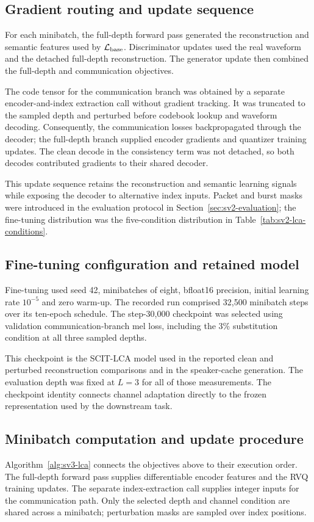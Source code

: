 \subsection{Gradient routing and update sequence}
For each minibatch, the full-depth forward pass generated the reconstruction and semantic features used by $\mathcal L_{\rm base}$. Discriminator updates used the real waveform and the detached full-depth reconstruction. The generator update then combined the full-depth and communication objectives.

The code tensor for the communication branch was obtained by a separate encoder-and-index extraction call without gradient tracking. It was truncated to the sampled depth and perturbed before codebook lookup and waveform decoding. Consequently, the communication losses backpropagated through the decoder; the full-depth branch supplied encoder gradients and quantizer training updates. The clean decode in the consistency term was not detached, so both decodes contributed gradients to their shared decoder.

This update sequence retains the reconstruction and semantic learning signals while exposing the decoder to alternative index inputs. Packet and burst masks were introduced in the evaluation protocol in Section~\ref{sec:sv2-evaluation}; the fine-tuning distribution was the five-condition distribution in Table~\ref{tab:sv2-lca-conditions}.

\subsection{Fine-tuning configuration and retained model}
Fine-tuning used seed 42, minibatches of eight, bfloat16 precision, initial learning rate $10^{-5}$ and zero warm-up. The recorded run comprised 32,500 minibatch steps over its ten-epoch schedule. The step-30,000 checkpoint was selected using validation communication-branch mel loss, including the 3\% substitution condition at all three sampled depths.

This checkpoint is the SCIT-LCA model used in the reported clean and perturbed reconstruction comparisons and in the speaker-cache generation. The evaluation depth was fixed at $L=3$ for all of those measurements. The checkpoint identity connects channel adaptation directly to the frozen representation used by the downstream task.

\subsection{Minibatch computation and update procedure}
Algorithm~\ref{alg:sv3-lca} connects the objectives above to their execution order. The full-depth forward pass supplies differentiable encoder features and the RVQ training updates. The separate index-extraction call supplies integer inputs for the communication path. Only the selected depth and channel condition are shared across a minibatch; perturbation masks are sampled over index positions.

